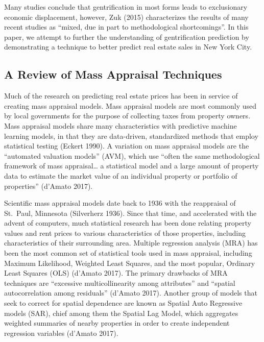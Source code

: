 \documentclass[12pt,]{article}
\begin{document}
Many studies conclude that gentrification in most forms leads to
exclusionary economic displacement, however, Zuk (2015) characterizes
the results of many recent studies as ``mixed, due in part to
methodological shortcomings''. In this paper, we attempt to further the
understanding of gentrification prediction by demonstrating a technique
to better predict real estate sales in New York City.

\hypertarget{a-review-of-mass-appraisal-techniques}{%
\subsection{A Review of Mass Appraisal
Techniques}\label{a-review-of-mass-appraisal-techniques}}

Much of the research on predicting real estate prices has been in
service of creating mass appraisal models. Mass appraisal models are
most commonly used by local governments for the purpose of collecting
taxes from property owners. Mass appraisal models share many
characteristics with predictive machine learning models, in that they
are data-driven, standardized methods that employ statistical testing
(Eckert 1990). A variation on mass appraisal models are the ``automated
valuation models'' (AVM), which use ``often the same methodological
framework of mass appraisal\ldots{} a statistical model and a large
amount of property data to estimate the market value of an individual
property or portfolio of properties'' (d'Amato 2017).

Scientific mass appraisal models date back to 1936 with the reappraisal
of St.~Paul, Minnesota (Silverherz 1936). Since that time, and
accelerated with the advent of computers, much statistical research has
been done relating property values and rent prices to various
characteristics of those properties, including characteristics of their
surrounding area. Multiple regression analysis (MRA) has been the most
common set of statistical tools used in mass appraisal, including
Maximum Likelihood, Weighted Least Squares, and the most popular,
Ordinary Least Squares (OLS) (d'Amato 2017). The primary drawbacks of
MRA techniques are ``excessive multicollinearity among attributes'' and
``spatial autocorrelation among residuals'' (d'Amato 2017). Another
group of models that seek to correct for spatial dependence are known as
Spatial Auto Regressive models (SAR), chief among them the Spatial Lag
Model, which aggregates weighted summaries of nearby properties in order
to create independent regression variables (d'Amato 2017).
\end{document}
